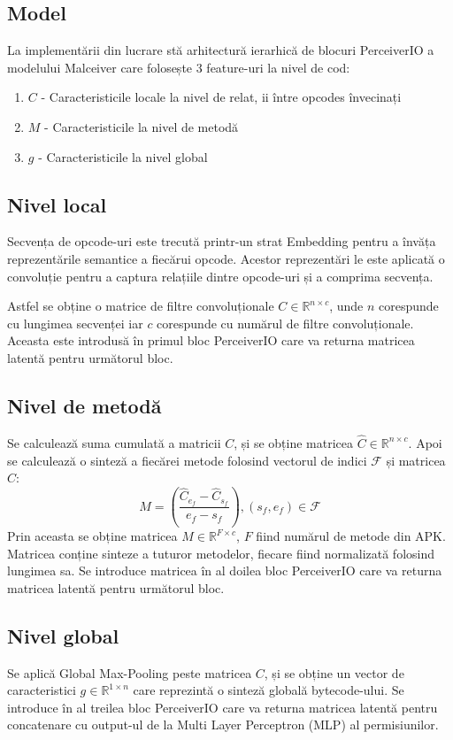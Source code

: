 \documentclass[12pt,a4paper]{report}
\begin{document}
\subsection{Model}
La implementării din lucrare stă arhitectură ierarhică de blocuri PerceiverIO\cite{jaegle2022perceiver}
a modelului Malceiver\cite{mclaughlin2022malceiver} care folosește 3 feature-uri la nivel de cod:
\begin{enumerate}
      \item $C$ - Caracteristicile locale la nivel de relat, ii între opcodes învecinați
      \item $M$ - Caracteristicile la nivel de metodă
      \item $g$ - Caracteristicile la nivel global
\end{enumerate}

\subsection{Nivel local}
Secvența de opcode-uri este trecută printr-un strat Embedding pentru a învăța reprezentările semantice a fiecărui opcode.
Acestor reprezentări le este aplicată o convoluție pentru a captura relațiile dintre opcode-uri și a comprima secvența\cite{hassani2022escaping}.

Astfel se obține o matrice de filtre convoluționale $C \in \mathbb{R}^{n \times c}$,
unde $n$ corespunde cu lungimea secvenței iar $c$ corespunde cu numărul de filtre convoluționale.
Aceasta este introdusă în primul bloc PerceiverIO care va returna matricea latentă pentru următorul bloc.

\subsection{Nivel de metodă}
Se calculează suma cumulată a matricii $C$, și se obține matricea $\hat{C} \in \mathbb{R}^{n \times c}$.
Apoi se calculează o sinteză a fiecărei metode folosind vectorul de indici $\mathcal{F}$ și matricea $\hat{C}$:
$$ M = \left( \frac{\widehat{C}_{e_f} - \widehat{C}_{s_f}}{e_f - s_f} \right), (s_f, e_f) \in \mathcal{F} $$
Prin aceasta se obține matricea $M \in \mathbb{R}^{F \times c}$, $F$ fiind numărul de metode din APK.
Matricea conține sinteze a tuturor metodelor, fiecare fiind normalizată folosind lungimea sa.
Se introduce matricea în al doilea bloc PerceiverIO care va returna matricea latentă pentru următorul bloc.

\subsection{Nivel global}
Se aplică Global Max-Pooling peste matricea $C$, și se obține un vector de caracteristici $g \in \mathbb{R}^{1 \times n}$ care reprezintă o sinteză globală bytecode-ului.
Se introduce în al treilea bloc PerceiverIO care va returna matricea latentă pentru concatenare cu output-ul de la Multi Layer Perceptron (MLP)\cite{haykin1994neural} al permisiunilor.
\end{document}

